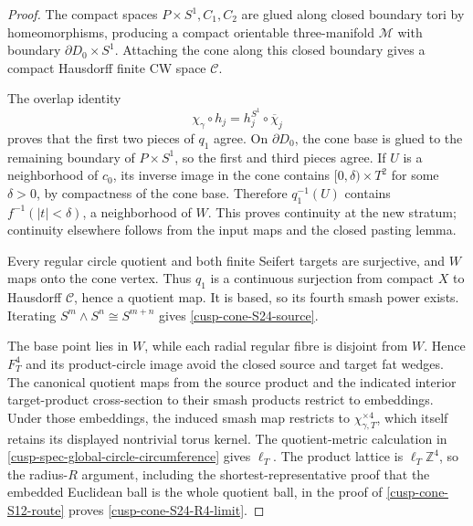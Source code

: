 \begin{proof}
The compact spaces \(P\times S^1,C_1,C_2\) are glued along closed boundary
tori by homeomorphisms, producing a compact orientable three-manifold
\(\mathcal M\) with boundary \(\partial D_0\times S^1\).  Attaching the cone
along this closed boundary gives a compact Hausdorff finite CW space
\(\mathcal C\).

The overlap identity
\[
 \chi_\gamma\circ h_j=h_j^{S^1}\circ\overline\chi_j
\]
proves that the first two pieces of \(q_1\) agree.  On \(\partial D_0\), the
cone base is glued to the remaining boundary of \(P\times S^1\), so the
first and third pieces agree.  If \(U\) is a neighborhood of \(c_0\), its
inverse image in the cone contains \([0,\delta)\times T^2\) for some
\(\delta>0\), by compactness of the cone base.  Therefore \(q_1^{-1}(U)\)
contains \(f^{-1}(|t|<\delta)\), a neighborhood of \(W\).  This proves
continuity at the new stratum; continuity elsewhere follows from the input
maps and the closed pasting lemma.

Every regular circle quotient and both finite Seifert targets are
surjective, and \(W\) maps onto the cone vertex.  Thus \(q_1\) is a
continuous surjection from compact \(X\) to Hausdorff \(\mathcal C\), hence
a quotient map.  It is based, so its fourth smash power exists.  Iterating
\(S^m\wedge S^n\cong S^{m+n}\) gives \cref{cusp-cone-S24-source}.

The base point lies in \(W\), while each radial regular fibre is disjoint
from \(W\).  Hence \(F_T^4\) and its product-circle image avoid the closed
source and target fat wedges.  The canonical quotient maps from the source
product and the indicated interior target-product cross-section to their
smash products restrict to embeddings.  Under those embeddings, the induced
smash map restricts to \(\chi_{\gamma,T}^{\times4}\), which itself retains
its displayed nontrivial torus kernel.
The quotient-metric calculation in
\cref{cusp-spec-global-circle-circumference} gives \(\ell_T\).
The product lattice is \(\ell_T\mathbb Z^4\), so the radius-\(R\) argument,
including the shortest-representative proof that the embedded Euclidean ball
is the whole quotient ball, in the proof of \cref{cusp-cone-S12-route} proves
\cref{cusp-cone-S24-R4-limit}.


\end{proof}

